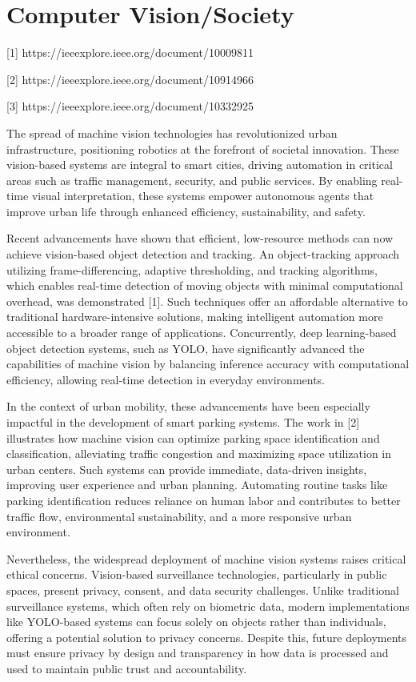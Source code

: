 \documentclass[conference]{IEEEtran}
\begin{document}
\section{Computer Vision/Society}

[1] https://ieeexplore.ieee.org/document/10009811

[2] https://ieeexplore.ieee.org/document/10914966

[3] https://ieeexplore.ieee.org/document/10332925

The spread of machine vision technologies has revolutionized urban infrastructure, 
positioning robotics at the forefront of societal innovation. 
These vision-based systems are integral to smart cities, 
driving automation in critical areas such as traffic management, 
security, 
and public services. 
By enabling real-time visual interpretation, 
these systems empower autonomous agents that improve urban life through enhanced efficiency, 
sustainability, and safety.

Recent advancements have shown that efficient, 
low-resource methods can now achieve vision-based object detection and tracking. 
An object-tracking approach utilizing frame-differencing, 
adaptive thresholding, 
and tracking algorithms, 
which enables real-time detection of moving objects with minimal computational overhead, 
was demonstrated [1]. 
Such techniques offer an affordable alternative to traditional hardware-intensive solutions, 
making intelligent automation more accessible to a broader range of applications. 
Concurrently, 
deep learning-based object detection systems, 
such as YOLO, 
have significantly advanced the capabilities of machine vision by balancing inference accuracy with computational efficiency, 
allowing real-time detection in everyday environments.

In the context of urban mobility, 
these advancements have been especially impactful in the development of smart parking systems. 
The work in [2] illustrates how machine vision can optimize parking space identification and classification, 
alleviating traffic congestion and maximizing space utilization in urban centers. 
Such systems can provide immediate, 
data-driven insights, 
improving user experience and urban planning. 
Automating routine tasks like parking identification reduces reliance on human labor and contributes to better traffic flow, 
environmental sustainability, 
and a more responsive urban environment.

Nevertheless, 
the widespread deployment of machine vision systems raises critical ethical concerns. 
Vision-based surveillance technologies, 
particularly in public spaces, 
present privacy, 
consent, 
and data security challenges. 
Unlike traditional surveillance systems, 
which often rely on biometric data, 
modern implementations like YOLO-based systems can focus solely on objects rather than individuals, 
offering a potential solution to privacy concerns. 
Despite this, 
future deployments must ensure privacy by design and transparency in how data is processed and used to maintain public trust and accountability.
\end{document}
